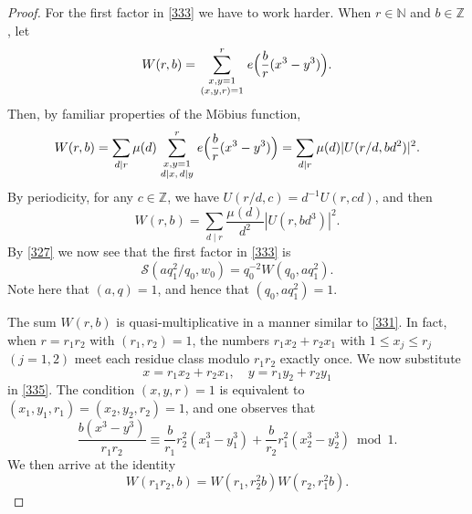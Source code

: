 \documentclass[reqno]{amsart}
\newcommand\NN{{\mathbb N}}
\newcommand\ZZ{{\mathbb Z}}
\newcommand{\f}[2]{\frac{#1}{#2}}
\newcommand{\multsum}[2]{\sum_{{\scriptstyle #1}\atop {\scriptstyle #2}}}
\numberwithin{equation}{section}
\begin{document}
\begin{proof}
For the first factor in \eqref{333} we have to work harder. When $r\in\NN$ and $b\in\ZZ$, let
\begin{equation}\label{335} W(r,b) = \multsum{x,y=1}{(x,y,r)=1}^r e\Big(\frac{b}{r}(x^3-y^3)\Big). \end{equation}
Then, by familiar properties of the M\"obius function,
$$ W(r,b) = \sum_{d\mid r} \mu(d)  \multsum{x,y=1}{d\mid x,\,d\mid y}^r e\Big(\frac{b}{r}(x^3-y^3)\Big) = \sum_{d\mid r} \mu(d)|U(r/d,bd^2)|^2. $$
By periodicity, for any $c\in\ZZ$, we have $U(r/d,c)=d^{-1}U(r,cd)$, and then
$$ W(r,b) = \sum_{d\mid r} \f{\mu(d)}{d^2} |U(r,bd^3)|^2. $$
By \eqref{327} we now see that the first factor in \eqref{333} is
\begin{equation}\label{336} \mathscr S(aq_1^2/q_0,w_0) = q_0^{-2} W(q_0,aq_1^2). \end{equation}
Note here that $(a,q)=1$, and hence that $(q_0,aq_1^2)=1$.

The sum $W(r,b)$ is quasi-multiplicative in a manner similar to \eqref{331}.
In fact, when $r=r_1r_2$ with $(r_1,r_2)=1$, the numbers $r_1x_2+r_2x_1$ with $1\le x_j\le r_j$  $(j=1,2)$ meet each residue class modulo $r_1r_2$ exactly once. We now substitute 
$$ x= r_1x_2+r_2x_1, \quad y= r_1y_2+r_2y_1 $$
in \eqref{335}. The condition $(x,y,r)=1$ is equivalent to $(x_1,y_1,r_1)=(x_2,y_2,r_2)=1$, and one observes that
$$ \frac{b(x^3-y^3)}{r_1r_2} \equiv \frac{b}{r_1} r_2^2(x_1^3-y_1^3) +
\frac{b}{r_2} r_1^2(x_2^3-y_2^3) \bmod 1. $$
We then arrive at the identity
\begin{equation}\label{337} W(r_1r_2,b) = W(r_1,r_2^2b) W(r_2,r_1^2 b). \end{equation}


\end{proof}
\end{document}

